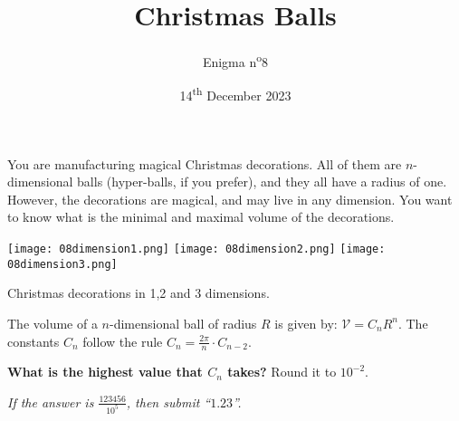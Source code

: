 \documentclass[a4paper, top=10mm]{article}
\title{\textbf{\huge{Christmas Balls}}}
\author{Enigma n\textsuperscript{o}8}
\date{14\textsuperscript{th} December 2023}
\begin{document}
	\maketitle
	
	You are manufacturing magical Christmas decorations.
	All of them  are $n$-dimensional balls (hyper-balls, if you prefer), and they all have a radius of one.
	However, the decorations are magical, and may live in any dimension.
	You want to know what is the minimal and maximal volume of the decorations.
	
	\begin{center}
		\texttt{[image: 08dimension1.png]}	\texttt{[image: 08dimension2.png]}		\texttt{[image: 08dimension3.png]}
		
		Christmas decorations in 1,2 and 3 dimensions.
	\end{center}
	
	The volume of a $n$-dimensional ball of radius $R$ is given by: $\mathcal{V} = C_n R^n$.
	The constants $C_n$ follow the rule $C_n = \frac{2\pi}{n} \cdot C_{n-2}$.
	
	\vspace{3cm}
	
	\textbf{What is the highest value that $C_n$ takes?} Round it to $10^{-2}$.
	
	\vspace{1cm}
	
	\textit{If the answer is $\frac{123456}{10^5}$, then submit “$1.23$”.}
	
	
\end{document}
